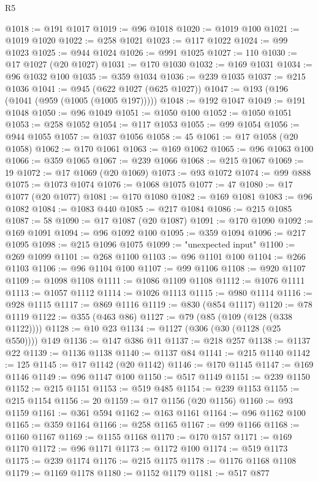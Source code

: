 \begin{lexlean}{R5}
\begin{coremodule}
@1018 := @191 @1017
@1019 := @96 @1018
@1020 := @1019 @100
@1021 := @1019 @1020
@1022 := @258 @1021
@1023 := @117 @1022
@1024 := @99 @1023
@1025 := @944 @1024
@1026 := @991 @1025
@1027 := 110
@1030 := @17 @1027 (@20 @1027)
@1031 := @170 @1030
@1032 := @169 @1031
@1034 := @96 @1032 @100
@1035 := @359 @1034
@1036 := @239 @1035
@1037 := @215 @1036
@1041 := @945 (@622 @1027 (@625 @1027))
@1047 := @193 (@196 (@1041 (@959 (@1005 (@1005 @197)))))
@1048 := @192 @1047
@1049 := @191 @1048
@1050 := @96 @1049
@1051 := @1050 @100
@1052 := @1050 @1051
@1053 := @258 @1052
@1054 := @117 @1053
@1055 := @99 @1054
@1056 := @944 @1055
@1057 := @1037 @1056
@1058 := 45
@1061 := @17 @1058 (@20 @1058)
@1062 := @170 @1061
@1063 := @169 @1062
@1065 := @96 @1063 @100
@1066 := @359 @1065
@1067 := @239 @1066
@1068 := @215 @1067
@1069 := 19
@1072 := @17 @1069 (@20 @1069)
@1073 := @93 @1072
@1074 := @99 @888
@1075 := @1073 @1074
@1076 := @1068 @1075
@1077 := 47
@1080 := @17 @1077 (@20 @1077)
@1081 := @170 @1080
@1082 := @169 @1081
@1083 := @96 @1082
@1084 := @1083 @440
@1085 := @217 @1084
@1086 := @215 @1085
@1087 := 58
@1090 := @17 @1087 (@20 @1087)
@1091 := @170 @1090
@1092 := @169 @1091
@1094 := @96 @1092 @100
@1095 := @359 @1094
@1096 := @217 @1095
@1098 := @215 @1096 @1075
@1099 := "unexpected input"
@1100 := @269 @1099
@1101 := @268 @1100
@1103 := @96 @1101 @100
@1104 := @266 @1103
@1106 := @96 @1104 @100
@1107 := @99 @1106
@1108 := @920 @1107
@1109 := @1098 @1108
@1111 := @1086 @1109 @1108
@1112 := @1076 @1111
@1113 := @1057 @1112
@1114 := @1026 @1113
@1115 := @980 @1114
@1116 := @928 @1115
@1117 := @869 @1116
@1119 := @830 (@854 @1117)
@1120 := @78 @1119
@1122 := @355 (@463 @86)
@1127 := @79 (@85 (@109 (@128 (@338 @1122))))
@1128 := @10 @23
@1134 := @1127 (@306 (@30 (@1128 (@25 @550)))) @149
@1136 := @147 @386 @11
@1137 := @218 @257
@1138 := @1137 @22
@1139 := @1136 @1138
@1140 := @1137 @84
@1141 := @215 @1140
@1142 := 125
@1145 := @17 @1142 (@20 @1142)
@1146 := @170 @1145
@1147 := @169 @1146
@1149 := @96 @1147 @100
@1150 := @517 @1149
@1151 := @239 @1150
@1152 := @215 @1151
@1153 := @519 @485
@1154 := @239 @1153
@1155 := @215 @1154
@1156 := 20
@1159 := @17 @1156 (@20 @1156)
@1160 := @93 @1159
@1161 := @361 @594
@1162 := @163 @1161
@1164 := @96 @1162 @100
@1165 := @359 @1164
@1166 := @258 @1165
@1167 := @99 @1166
@1168 := @1160 @1167
@1169 := @1155 @1168
@1170 := @170 @157
@1171 := @169 @1170
@1172 := @96 @1171
@1173 := @1172 @100
@1174 := @519 @1173
@1175 := @239 @1174
@1176 := @215 @1175
@1178 := @1176 @1168 @1108
@1179 := @1169 @1178
@1180 := @1152 @1179
@1181 := @517 @877

\end{coremodule}
\end{lexlean}
